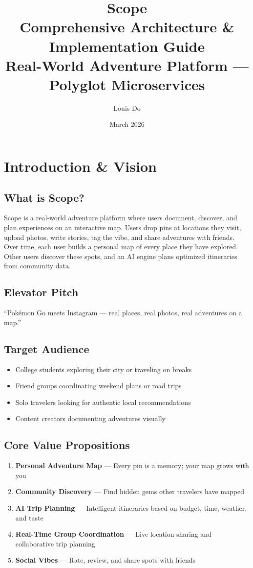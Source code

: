 \documentclass[12pt,letterpaper]{article}
\title{\Huge\textbf{Scope}\\[10pt]\Large Comprehensive Architecture \& Implementation Guide\\[5pt]\normalsize Real-World Adventure Platform --- Polyglot Microservices}
\author{Louis Do}
\date{March 2026}
\begin{document}
\maketitle
\tableofcontents
\newpage

\section{Introduction \& Vision}

\subsection{What is Scope?}
Scope is a real-world adventure platform where users document, discover, and plan experiences on an interactive map. Users drop pins at locations they visit, upload photos, write stories, tag the vibe, and share adventures with friends. Over time, each user builds a personal map of every place they have explored. Other users discover these spots, and an AI engine plans optimized itineraries from community data.

\subsection{Elevator Pitch}
``Pok\'emon Go meets Instagram --- real places, real photos, real adventures on a map.''

\subsection{Target Audience}
\begin{itemize}
  \item College students exploring their city or traveling on breaks
  \item Friend groups coordinating weekend plans or road trips
  \item Solo travelers looking for authentic local recommendations
  \item Content creators documenting adventures visually
\end{itemize}

\subsection{Core Value Propositions}
\begin{enumerate}
  \item \textbf{Personal Adventure Map} --- Every pin is a memory; your map grows with you
  \item \textbf{Community Discovery} --- Find hidden gems other travelers have mapped
  \item \textbf{AI Trip Planning} --- Intelligent itineraries based on budget, time, weather, and taste
  \item \textbf{Real-Time Group Coordination} --- Live location sharing and collaborative trip planning
  \item \textbf{Social Vibes} --- Rate, review, and share spots with friends
\end{enumerate}
\end{document}
